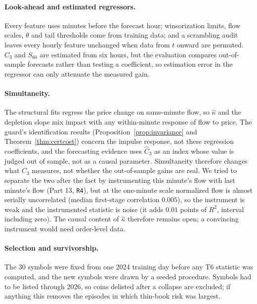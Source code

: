 \documentclass[12pt]{article}
\theoremstyle{definition}
\theoremstyle{remark}
\begin{document}
\paragraph{Look-ahead and estimated regressors.} Every feature uses minutes before the forecast hour; winsorization limits, flow scales, $\theta$ and tail thresholds come from training data; and a scrambling audit leaves every hourly feature unchanged when data from $t$ onward are permuted. $\hat C_3$ and $S_{60}$ are estimated from six hours, but the evaluation compares out-of-sample forecasts rather than testing a coefficient, so estimation error in the regressor can only attenuate the measured gain.

\paragraph{Simultaneity.} The structural fits regress the price change on same-minute flow, so $\hat\kappa$ and the depletion slope mix impact with any within-minute response of flow to price. The guard's identification results (Proposition~\ref{prop:invariance} and Theorem~\ref{thm:certcost}) concern the impulse response, not these regression coefficients, and the forecasting evidence uses $\hat C_3$ as an index whose value is judged out of sample, not as a causal parameter. Simultaneity therefore changes what $\hat C_3$ measures, not whether the out-of-sample gains are real. We tried to separate the two after the fact by instrumenting this minute's flow with last minute's flow (Part 13, \texttt{R4}), but at the one-minute scale normalized flow is almost serially uncorrelated (median first-stage correlation $0.005$), so the instrument is weak and the instrumented statistic is noise (it adds $0.01$ points of $R^2$, interval including zero). The causal content of $\hat\kappa$ therefore remains open; a convincing instrument would need order-level data.

\paragraph{Selection and survivorship.} The 30 symbols were fixed from one 2024 training day before any T6 statistic was computed, and the new symbols were drawn by a seeded procedure. Symbols had to be listed through 2026, so coins delisted after a collapse are excluded; if anything this removes the episodes in which thin-book risk was largest.
\end{document}
